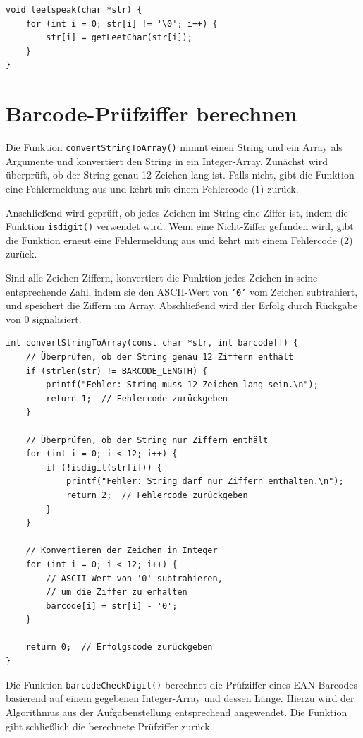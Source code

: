 \begin{verbatim}
void leetspeak(char *str) {
    for (int i = 0; str[i] != '\0'; i++) {
        str[i] = getLeetChar(str[i]);
    }
}
\end{verbatim}



\chapter{Barcode-Prüfziffer berechnen}

Die Funktion \texttt{convertStringToArray()} nimmt einen String und ein
Array als Argumente und konvertiert den String in ein Integer-Array. Zunächst
wird überprüft, ob der String genau 12 Zeichen lang ist. Falls nicht, gibt die
Funktion eine Fehlermeldung aus und kehrt mit einem Fehlercode (1) zurück.

Anschließend wird geprüft, ob jedes Zeichen im String eine Ziffer ist, indem die
Funktion \texttt{isdigit()} verwendet wird. Wenn eine Nicht-Ziffer
gefunden wird, gibt die Funktion erneut eine Fehlermeldung aus und kehrt mit
einem Fehlercode (2) zurück.

Sind alle Zeichen Ziffern, konvertiert die Funktion jedes Zeichen in seine
entsprechende Zahl, indem sie den ASCII-Wert von \texttt{'0'} vom Zeichen
subtrahiert, und speichert die Ziffern im Array. Abschließend wird der Erfolg
durch Rückgabe von 0 signalisiert.

\begin{verbatim}
int convertStringToArray(const char *str, int barcode[]) {
    // Überprüfen, ob der String genau 12 Ziffern enthält
    if (strlen(str) != BARCODE_LENGTH) {
        printf("Fehler: String muss 12 Zeichen lang sein.\n");
        return 1;  // Fehlercode zurückgeben
    }

    // Überprüfen, ob der String nur Ziffern enthält
    for (int i = 0; i < 12; i++) {
        if (!isdigit(str[i])) {
            printf("Fehler: String darf nur Ziffern enthalten.\n");
            return 2;  // Fehlercode zurückgeben
        }
    }

    // Konvertieren der Zeichen in Integer
    for (int i = 0; i < 12; i++) {
        // ASCII-Wert von '0' subtrahieren,
        // um die Ziffer zu erhalten
        barcode[i] = str[i] - '0';
    }

    return 0;  // Erfolgscode zurückgeben
}
\end{verbatim}

Die Funktion \texttt{barcodeCheckDigit()} berechnet die Prüfziffer eines
EAN-Barcodes basierend auf einem gegebenen Integer-Array und dessen Länge.
Hierzu wird der Algorithmus aus der Aufgabenstellung entsprechend angewendet.
Die Funktion gibt schließlich die berechnete Prüfziffer zurück.

